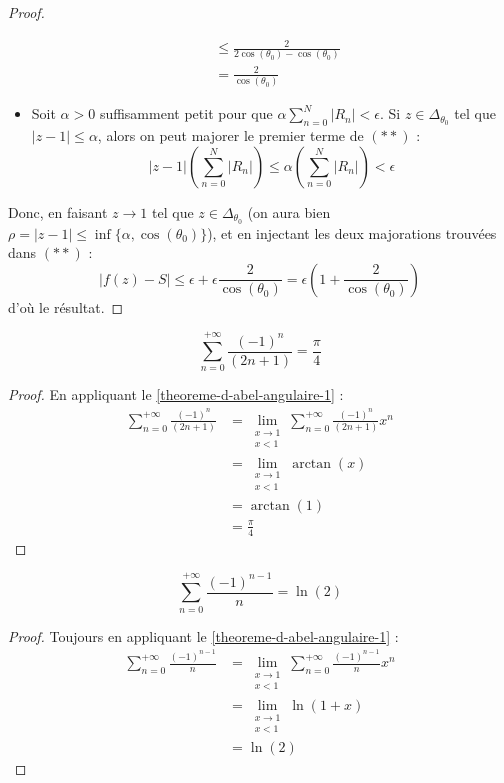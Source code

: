 \begin{proof}
\begin{itemize}
\begin{align*}
				&\leq \frac{2}{2\cos(\theta_0) - \cos(\theta_0)} \\
				&= \frac{2}{\cos(\theta_0)}
			\end{align*}
			\item Soit $\alpha > 0$ suffisamment petit pour que $\alpha \sum_{n=0}^N |R_n| < \epsilon$. Si $z \in \Delta_{\theta_0}$ tel que $|z-1| \leq \alpha$, alors on peut majorer le premier terme de $(**)$ :
			\[ |z-1| \left( \sum_{n=0}^N |R_n| \right) \leq \alpha \left( \sum_{n=0}^N |R_n| \right) < \epsilon \]
		\end{itemize}
		Donc, en faisant $z \longrightarrow 1$ tel que $z \in \Delta_{\theta_0}$ (on aura bien $\rho = |z-1| \leq \inf \{ \alpha, \cos(\theta_0) \}$), et en injectant les deux majorations trouvées dans $(**)$ :
		\[ |f(z)-S| \leq \epsilon + \epsilon \frac{2}{\cos(\theta_0)} = \epsilon \left(1 + \frac{2}{\cos(\theta_0)} \right) \]
		d'où le résultat.
	\end{proof}

	\begin{application}
		\[ \sum_{n=0}^{+\infty} \frac{(-1)^n}{(2n+1)} = \frac{\pi}{4} \]
	\end{application}

	\begin{proof}
		En appliquant le \cref{theoreme-d-abel-angulaire-1} :
		\begin{align*}
			\sum_{n=0}^{+\infty} \frac{(-1)^n}{(2n+1)} &= \lim_{\substack{x \rightarrow 1 \\ x < 1}} \sum_{n=0}^{+\infty} \frac{(-1)^n}{(2n+1)} x^n \\
			&= \lim_{\substack{x \rightarrow 1 \\ x < 1}} \arctan(x) \\
			&= \arctan(1) \\
			&= \frac{\pi}{4}
		\end{align*}
	\end{proof}

	\begin{application}
		\[ \sum_{n=0}^{+\infty} \frac{(-1)^{n-1}}{n} = \ln(2) \]
	\end{application}

	\begin{proof}
		Toujours en appliquant le \cref{theoreme-d-abel-angulaire-1} :
		\begin{align*}
			\sum_{n=0}^{+\infty} \frac{(-1)^{n-1}}{n} &= \lim_{\substack{x \rightarrow 1 \\ x < 1}} \sum_{n=0}^{+\infty} \frac{(-1)^{n-1}}{n} x^n \\
			&= \lim_{\substack{x \rightarrow 1 \\ x < 1}} \ln(1 + x) \\
			&= \ln(2)
		\end{align*}
	\end{proof}

